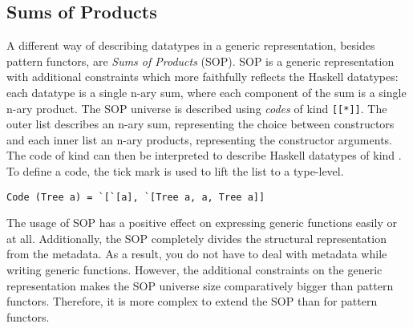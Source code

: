 \subsection{Sums of Products}

A different way of describing datatypes in a generic representation, besides pattern functors, are \textit{Sums of Products}\cite{vries2014sums} (SOP). SOP is a generic representation with additional constraints which more faithfully reflects the Haskell datatypes: each datatype is a single n-ary sum, where each component of the sum is a single n-ary product. The SOP universe is described using \textit{codes} of kind \texttt{[[*]]}. The outer list describes an n-ary sum, representing the choice between constructors and each inner list an n-ary products, representing the constructor arguments.  The code of kind \inlinehaskell{[[*]]} can then be interpreted to describe Haskell datatypes of kind \inlinehaskell{*}. To define a code, the tick mark  is used to lift the list to a type-level. 

\begin{verbatim}
Code (Tree a) = `[`[a], `[Tree a, a, Tree a]]
\end{verbatim}

The usage of SOP has a positive effect on expressing generic functions easily or at all. Additionally, the SOP completely divides the structural representation from the metadata. As a result, you do not have to deal with metadata while writing generic functions. However, the additional constraints on the generic representation makes the SOP universe size comparatively bigger than pattern functors. Therefore, it is more complex to extend the SOP than for pattern functors.

